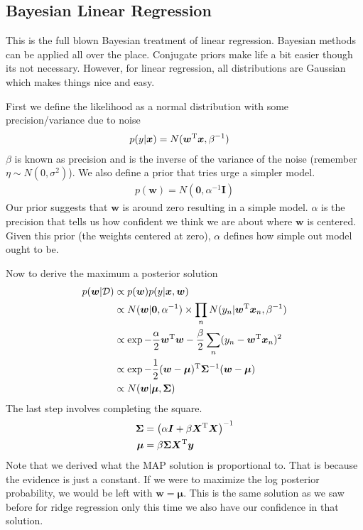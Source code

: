 \documentclass[11pt]{article}
\newcommand{\vct}[1]{\boldsymbol{#1}} %
\newcommand{\mat}[1]{\boldsymbol{#1}} %
\newcommand{\T}{^{\textrm T}} %
\begin{document}
\subsection{Bayesian Linear Regression}
This is the full blown Bayesian treatment of linear regression. Bayesian methods can be applied all over the place. Conjugate priors make life a bit easier though its not necessary. However, for linear regression, all distributions are Gaussian which makes things nice and easy. 

First we define the likelihood as a normal distribution with some precision/variance due to noise
\begin{align*}
p(y|\vct{x}) &= N(\vct{w}\T\vct{x}, \beta^{-1})
\end{align*}
$\beta$ is known as precision and is the inverse of the variance of the noise (remember $\eta \sim N(0,\sigma^2)$). We also define a prior that tries urge a simpler model.
\begin{align*}
p(\vct{w}) = N(\vct{0},\alpha^{-1}\mat{I})
\end{align*}
Our prior suggests that $\vct{w}$ is around zero resulting in a simple model. $\alpha$ is the precision that tells us how confident we think we are about where $\vct{w}$ is centered. Given this prior (the weights centered at zero), $\alpha$ defines how simple out model ought to be.

Now to derive the maximum a posterior solution
\begin{align*}
p(\vct{w}|\mathcal{D}) &\propto p(\vct{w})  p(y|\vct{x}, \vct{w})\\
&\propto N(\vct{w}|\vct{0}, \alpha^{-1}) \times \prod_n N(y_n|\vct{w}\T\vct{x}_n, \beta^{-1})\\
&\propto \exp{- \frac{\alpha}{2}\vct{w}\T\vct{w} - \frac{\beta}{2}\sum_n(y_n - \vct{w}\T\vct{x}_n)^2} \\
&\propto \exp{ - \frac{1}{2}(\vct{w} - \vct{\mu})\T \mat{\Sigma}^{-1}(\vct{w} - \vct{\mu})}\\
&\propto N(\vct{w}|\vct{\mu}, \mat{\Sigma})
\end{align*}
The last step involves completing the square.
\begin{align*}
\mat{\Sigma} &= \left(\alpha \mat{I} + \beta \mat{X}\T\mat{X}\right)^{-1}\\
\vct{\mu} &= \beta \mat{\Sigma} \mat{X}\T \vct{y}
\end{align*}
Note that we derived what the MAP solution is proportional to. That is because the evidence is just a constant. If we were to maximize the log posterior probability, we would be left with $\vct{w} = \vct{\mu}$. This is the same solution as we saw before for ridge regression only this time we also have our confidence in that solution. 
\end{document}
